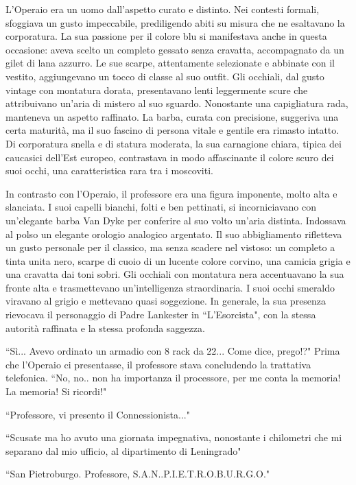 \documentclass[12pt,b5paper]{article}
\begin{document}
L'Operaio era un uomo dall'aspetto curato e distinto. Nei contesti formali,
sfoggiava un gusto impeccabile, prediligendo abiti su misura che ne esaltavano la
corporatura. La sua passione per il colore blu si manifestava anche in questa
occasione: aveva scelto un completo gessato senza cravatta, accompagnato da un
gilet di lana azzurro. Le sue scarpe, attentamente selezionate e abbinate con il vestito, aggiungevano un tocco di classe al suo outfit. Gli occhiali, dal gusto
vintage con montatura dorata, presentavano lenti leggermente scure che attribuivano
un'aria di mistero al suo sguardo. Nonostante una capigliatura rada, manteneva
un aspetto raffinato. La barba, curata con precisione, suggeriva una certa
maturità, ma il suo fascino di persona vitale e gentile era rimasto intatto.
Di corporatura snella e di statura moderata, la sua carnagione chiara, tipica dei
caucasici dell'Est europeo, contrastava in modo affascinante il colore scuro dei
suoi occhi, una caratteristica rara tra i moscoviti.

In contrasto con l'Operaio, il professore era una figura imponente, molto alta
e slanciata. I suoi capelli bianchi, folti e ben pettinati, si incorniciavano
con un'elegante barba Van Dyke per conferire al suo volto un'aria distinta.
Indossava al polso un elegante orologio analogico argentato.
Il suo abbigliamento rifletteva un gusto personale per il classico, ma senza
scadere nel vistoso: un completo a tinta unita nero, scarpe di cuoio di un 
lucente colore corvino, una camicia grigia e una cravatta dai toni sobri. 
Gli occhiali con montatura nera accentuavano la sua fronte alta e trasmettevano
un'intelligenza straordinaria. I suoi occhi smeraldo viravano al grigio e
mettevano quasi soggezione. In generale, la sua presenza rievocava il
personaggio di Padre Lankester in ``L'Esorcista", con la stessa autorità
raffinata e la stessa profonda saggezza.

``Sì... Avevo ordinato un armadio con 8 rack da 22... Come dice, prego!?"
Prima che l'Operaio ci presentasse, il professore stava concludendo la 
trattativa telefonica. ``No, no.. non ha importanza il processore,
per me conta la memoria! La memoria! Si ricordi!"

``Professore, vi presento il Connessionista..."

``Scusate ma ho avuto una giornata impegnativa, nonostante i chilometri che mi
separano dal mio ufficio, al dipartimento di Leningrado"

``San Pietroburgo. Professore, S.A.N..P.I.E.T.R.O.B.U.R.G.O."
\end{document}

